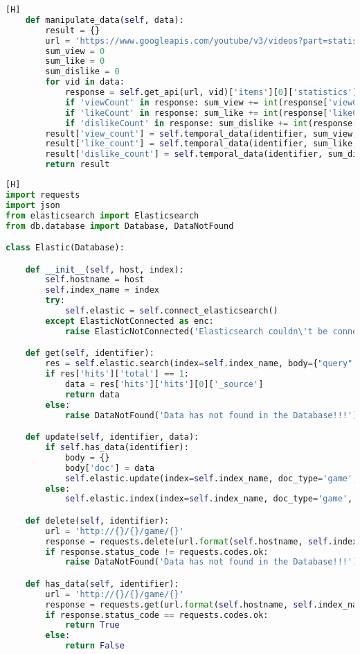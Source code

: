 \begin{anexosenv}
\begin{lstlisting}[language={Python}, caption = {Código do \textit{plugin} \textit{\textbf{Youtube API}}}] [H]
	def manipulate_data(self, data):
		result = {}
		url = 'https://www.googleapis.com/youtube/v3/videos?part=statistics&id={}&key={}'
		sum_view = 0
		sum_like = 0
		sum_dislike = 0
		for vid in data:
			response = self.get_api(url, vid)['items'][0]['statistics']
			if 'viewCount' in response: sum_view += int(response['viewCount'])
			if 'likeCount' in response: sum_like += int(response['likeCount'])
			if 'dislikeCount' in response: sum_dislike += int(response['dislikeCount'])
		result['view_count'] = self.temporal_data(identifier, sum_view, 'view_count')
		result['like_count'] = self.temporal_data(identifier, sum_like, 'like_count')
		result['dislike_count'] = self.temporal_data(identifier, sum_dislike, 'dislike_count')
		return result
\end{lstlisting}
\begin{lstlisting}[language={Python}, caption = {Código do \textit{\textbf{Elasticsearch}}}] [H]
import requests
import json
from elasticsearch import Elasticsearch
from db.database import Database, DataNotFound

class Elastic(Database):

	def __init__(self, host, index):
		self.hostname = host
		self.index_name = index
		try:
			self.elastic = self.connect_elasticsearch()
		except ElasticNotConnected as enc:
			raise ElasticNotConnected('Elasticsearch couldn\'t be connected!!!')

	def get(self, identifier):
		res = self.elastic.search(index=self.index_name, body={"query": {"match": {"steam_id": int(identifier)}}})
		if res['hits']['total'] == 1:
			data = res['hits']['hits'][0]['_source']
			return data
		else:
			raise DataNotFound('Data has not found in the Database!!!')

	def update(self, identifier, data):
		if self.has_data(identifier):
			body = {}
			body['doc'] = data
			self.elastic.update(index=self.index_name, doc_type='game', id=identifier, body=body)
		else:
			self.elastic.index(index=self.index_name, doc_type='game', id=identifier, body=data)

	def delete(self, identifier):
		url = 'http://{}/{}/game/{}'
		response = requests.delete(url.format(self.hostname, self.index_name, identifier))
		if response.status_code != requests.codes.ok:
			raise DataNotFound('Data has not found in the Database!!!')

	def has_data(self, identifier):
		url = 'http://{}/{}/game/{}'
		response = requests.get(url.format(self.hostname, self.index_name, identifier))
		if response.status_code == requests.codes.ok:
			return True
		else:
			return False
	

\end{lstlisting}
\end{anexosenv}
